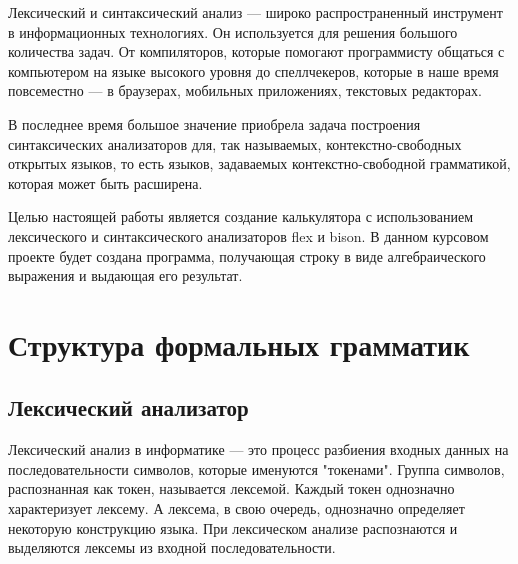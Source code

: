 \documentclass[bachelor, och, coursework, times]{SCWorks}
\begin{document}
\tableofcontents





\intro

Лексический и синтаксический анализ --- широко распространенный инструмент в информационных технологиях. Он используется для решения большого количества задач. От компиляторов, которые помогают программисту общаться с компьютером на языке высокого уровня до спеллчекеров, которые в наше время повсеместно --- в браузерах, мобильных приложениях, текстовых редакторах.

В последнее время большое значение приобрела задача построения синтаксических анализаторов для, так называемых, контекстно-свободных открытых языков, то есть языков, задаваемых контекстно-свободной грамматикой, которая может быть расширена.

Целью настоящей работы является создание калькулятора с использованием лексического и синтаксического анализаторов flex и bison. В данном курсовом проекте будет создана программа, получающая строку в виде алгебраического выражения и выдающая его результат.


\section{Структура формальных грамматик}
\subsection{Лексический анализатор}

Лексический анализ в информатике --- это процесс разбиения входных данных на последовательности символов, которые именуются "токенами". Группа символов, распознанная как токен, называется лексемой. Каждый токен однозначно характеризует лексему. А лексема, в свою очередь, однозначно определяет некоторую конструкцию языка. При лексическом анализе распознаются и выделяются лексемы из входной последовательности.
\end{document}
